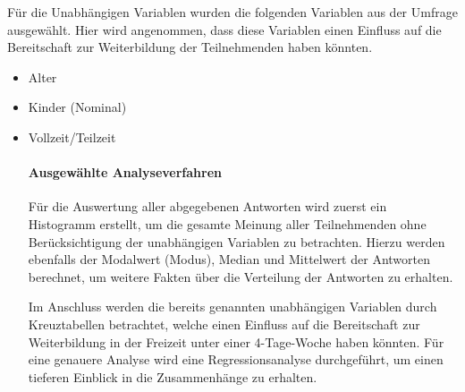Für die Unabhängigen Variablen wurden die folgenden Variablen aus der Umfrage ausgewählt. 
Hier wird angenommen, dass diese Variablen einen Einfluss auf die Bereitschaft zur 
Weiterbildung der Teilnehmenden haben könnten.
\begin{itemize}
    \item Alter
    \item Kinder (Nominal)
    \item Vollzeit/Teilzeit


\paragraph*{Ausgewählte Analyseverfahren}

Für die Auswertung aller abgegebenen Antworten wird zuerst ein Histogramm erstellt, um die gesamte Meinung
aller Teilnehmenden ohne Berücksichtigung der unabhängigen Variablen zu betrachten.
Hierzu werden ebenfalls der Modalwert (Modus), Median und Mittelwert der Antworten berechnet, um weitere
Fakten über die Verteilung der Antworten zu erhalten.

Im Anschluss werden die bereits genannten unabhängigen Variablen durch Kreuztabellen betrachtet, 
welche einen Einfluss auf die Bereitschaft zur Weiterbildung in der Freizeit unter einer 4-Tage-Woche 
haben könnten. 
Für eine genauere Analyse wird eine Regressionsanalyse durchgeführt, 
um einen tieferen Einblick in die Zusammenhänge zu erhalten. %















\end{itemize}
